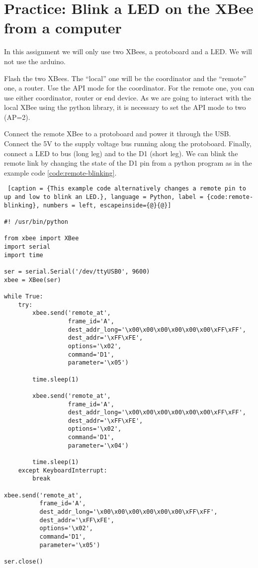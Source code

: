 \chapter{Practice: Blink a LED on the XBee from a computer}

In this assignment we will only use two XBees, a protoboard and a LED.
We will not use the arduino.

Flash the two XBees.
The ``local'' one will be the coordinator and the ``remote'' one, a router.
Use the API mode for the coordinator.
For the remote one, you can use either coordinator, router or end device.
As we are going to interact with the local XBee using the python library, it is necessary to set the API mode to two (AP=2).

Connect the remote XBee to a protoboard and power it through the USB.
Connect the 5V to the supply voltage bus running along the protoboard.
Finally, connect a LED to bus (long leg) and to the D1 (short leg).
We can blink the remote link by changing the state of the D1 pin from a python program as in the example code \ref{code:remote-blinking}.

\begin{lstlisting} [caption = {This example code alternatively changes a remote pin to up and low to blink an LED.}, language = Python, label = {code:remote-blinking}, numbers = left, escapeinside={@}{@}]

#! /usr/bin/python

from xbee import XBee
import serial
import time

ser = serial.Serial('/dev/ttyUSB0', 9600)
xbee = XBee(ser)

while True:
    try:
        xbee.send('remote_at', 
                  frame_id='A',
                  dest_addr_long='\x00\x00\x00\x00\x00\x00\xFF\xFF',
                  dest_addr='\xFF\xFE',
                  options='\x02',
                  command='D1',
                  parameter='\x05')
          
        time.sleep(1)
        
        xbee.send('remote_at', 
                  frame_id='A',
                  dest_addr_long='\x00\x00\x00\x00\x00\x00\xFF\xFF',
                  dest_addr='\xFF\xFE',
                  options='\x02',
                  command='D1',
                  parameter='\x04')
          
        time.sleep(1)
    except KeyboardInterrupt:
        break

xbee.send('remote_at', 
          frame_id='A',
          dest_addr_long='\x00\x00\x00\x00\x00\x00\xFF\xFF',
          dest_addr='\xFF\xFE',
          options='\x02',
          command='D1',
          parameter='\x05')

ser.close()


\end{lstlisting}


